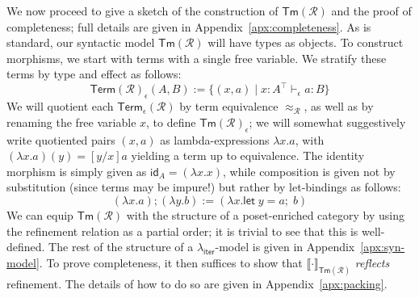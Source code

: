 \documentclass[acmsmall,screen,anonymous,review]{acmart}
\newcommand{\mc}[1]{\ensuremath{\mathcal{#1}}}
\newcommand{\ms}[1]{\ensuremath{\mathsf{#1}}}
\newcommand{\letexpr}[3]{\ensuremath{\ms{let}\;#1 = #2;\;#3}}
\newcommand{\hasty}[4]{#1 \vdash_{#2} #3: {#4}}
\newcommand{\dnt}[1]{\llbracket{#1}\rrbracket}
\newcommand{\subiterexp}{\texorpdfstring{\(\lambda_{\ms{iter}}\)}{lambda-iter}}
\begin{document}
We now proceed to give a sketch of the construction of $\ms{Tm}(\mc{R})$ and the proof of 
completeness; full details are given in Appendix~\ref{apx:completeness}. As is standard, our 
syntactic model $\ms{Tm}(\mc{R})$ will have types as objects. 
To construct morphisms, we start with terms with a single free variable. We stratify these terms by
type and effect as follows:
$$
\ms{Term}(\mc{R})_\epsilon(A, B) := \{(x, a) \mid \hasty{x : A^\top}{\epsilon}{a}{B}\}
$$
We will quotient each $\ms{Term}_\epsilon(\mc{R})$ by term equivalence $\approx_{\mc{R}}$, as well
as by renaming the free variable $x$, to define $\ms{Tm}(\mc{R})_\epsilon$; we will somewhat
suggestively write quotiented pairs $(x, a)$ as lambda-expressions $\lambda x. a$, with $(\lambda x
. a)(y) = [y/x]a$ yielding a term up to equivalence. The identity morphism is simply given as
$\ms{id}_A = (\lambda x. x)$, while composition is given not by substitution (since terms may be
impure!) but rather by let-bindings as follows:
$$
(\lambda x . a) ; (\lambda y . b) := (\lambda x . \letexpr{y}{a}{b})
$$
We can equip $\ms{Tm}(\mc{R})$ with the structure of a poset-enriched category by using the
refinement relation as a partial order; it is trivial to see that this is well-defined. The rest of
the structure of a \subiterexp{}-model is given in Appendix~\ref{apx:syn-model}. To prove
completeness, it then suffices to show that $\dnt{\cdot}_{\ms{Tm}(\mc{R})}$ \emph{reflects}
refinement. The details of how to do so are given in Appendix~\ref{apx:packing}.
\end{document}
